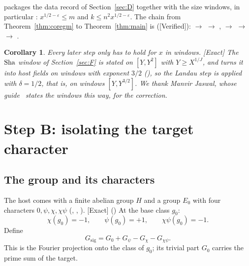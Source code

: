 \documentclass[11pt]{article}
\newcommand{\Exact}{\textcolor{exactc}{\textsf{\small[Exact]}}}
\newcommand{\Verified}{\textcolor{verc}{\textsf{\small[Verified]}}}
\newcommand{\eps}{\varepsilon}
\newcommand{\Gsig}{G_{\mathrm{sig}}}
\theoremstyle{plain}
\newtheorem{corollary}[theorem]{Corollary}
\theoremstyle{definition}
\begin{document}
 packages the data record of Section~\ref{sec:D} together with the size windows, in
particular : $x^{1/2-\eps}\le m$ and $k\le n^2x^{1/2-\eps}$. The chain from
Theorem~\ref{thm:coregm} to Theorem~\ref{thm:main} is (\Verified):
 $\to$  $\to$ ,
 $\to$  $\to$ 
$\to$ .

\begin{corollary}
Every later step only has to hold for $x$ in windows. \Exact{} The $\mathrm{Sha}$ window of
Section~\ref{sec:F} is stated on $[Y,Y^2]$ with $Y\ge X^{1/J}$, and  turns it into
host fields on windows with exponent $3/2$ (), so the Landau step is applied
with $\delta=1/2$, that is, on windows $[Y,Y^{3/2}]$. We thank Manvir Jaswal, whose
guide~\cite{jaswal} states the windows this way, for the correction.
\end{corollary}

\section{Step B: isolating the target character}\label{sec:B}

\subsection{The group and its characters}

The host comes with a finite abelian group $H$ and a group $E_0$ with four characters
$0,\psi,\chi,\chi\psi$ (, , ). \Exact{}
() At the base class $g_0$:
\[
\chi(g_0)=-1,\qquad \psi(g_0)=+1,\qquad \chi\psi(g_0)=-1.
\]
Define
\[
\Gsig = G_0 + G_\psi - G_\chi - G_{\chi\psi}.
\]
This is the Fourier projection onto the class of $g_0$; its trivial part $G_0$ carries the prime
sum of the target.
\end{document}
